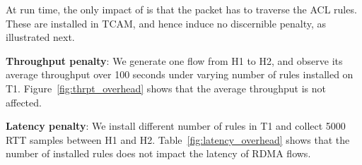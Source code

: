 At run time, the only impact of \sysname{} is that the packet has
to traverse the ACL rules. These are installed in TCAM, and hence induce
no discernible penalty, as illustrated next.

\textbf{Throughput penalty}: We generate one flow from H1 to H2, and observe
its average throughput over 100 seconds under varying number of \sysname{} rules
installed on T1. Figure~\ref{fig:thrpt_overhead} shows that the average
throughput is not affected.

\textbf{Latency penalty}: We install different number of \sysname{} rules in T1
and collect 5000 RTT samples between H1 and H2.
Table~\ref{fig:latency_overhead} shows that the number of installed rules does
not impact the latency of RDMA flows.

